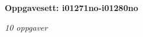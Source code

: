 \centerline{\bf Oppgavesett: i01271no-i01280no}
\vskip 10pt
\centerline{\it 10 oppgaver}\vskip 10pt
\vskip 10pt
